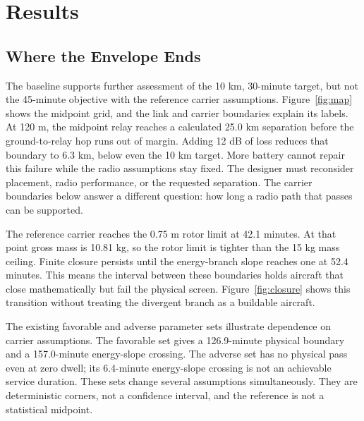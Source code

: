 \documentclass[twocolumn,letterpaper]{IEEEAerospaceCLS}
\begin{document}
\section{Results}\label{sec:results}

\subsection{Where the Envelope Ends}

The baseline supports further assessment of the 10 km, 30-minute target, but not the 45-minute objective with the reference carrier assumptions. Figure~\ref{fig:map} shows the midpoint grid, and the link and carrier boundaries explain its labels. At 120 m, the midpoint relay reaches a calculated 25.0 km separation before the ground-to-relay hop runs out of margin. Adding 12 dB of loss reduces that boundary to 6.3 km, below even the 10 km target. More battery cannot repair this failure while the radio assumptions stay fixed. The designer must reconsider placement, radio performance, or the requested separation. The carrier boundaries below answer a different question: how long a radio path that passes can be supported.


The reference carrier reaches the 0.75 m rotor limit at 42.1 minutes. At that point gross mass is 10.81 kg, so the rotor limit is tighter than the 15 kg mass ceiling. Finite closure persists until the energy-branch slope reaches one at 52.4 minutes. This means the interval between these boundaries holds aircraft that close mathematically but fail the physical screen. Figure~\ref{fig:closure} shows this transition without treating the divergent branch as a buildable aircraft.

The existing favorable and adverse parameter sets illustrate dependence on carrier assumptions. The favorable set gives a 126.9-minute physical boundary and a 157.0-minute energy-slope crossing. The adverse set has no physical pass even at zero dwell; its 6.4-minute energy-slope crossing is not an achievable service duration. These sets change several assumptions simultaneously. They are deterministic corners, not a confidence interval, and the reference is not a statistical midpoint.
\end{document}
